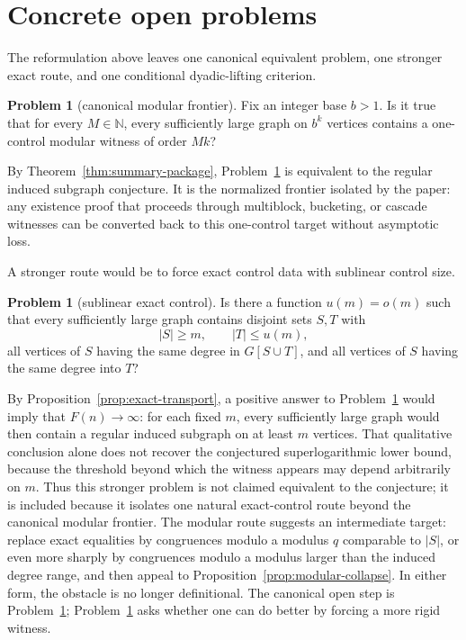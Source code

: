 \documentclass[11pt]{amsart}
\theoremstyle{definition}
\newtheorem{problem}[theorem]{Problem}
\newcommand{\N}{\mathbb{N}}
\begin{document}
\section{Concrete open problems}

The reformulation above leaves one canonical equivalent problem, one stronger exact route, and one
conditional dyadic-lifting criterion.

\begin{problem}[canonical modular frontier]\label{prob:canonical-frontier}
Fix an integer base $b>1$. Is it true that for every $M \in \N$, every sufficiently large graph on
$b^k$ vertices contains a one-control modular witness of order $Mk$?
\end{problem}

By Theorem~\ref{thm:summary-package}, Problem~\ref{prob:canonical-frontier} is equivalent to the
regular induced subgraph conjecture. It is the normalized frontier isolated by the paper: any
existence proof that proceeds through multiblock, bucketing, or cascade witnesses can be converted
back to this one-control target without asymptotic loss.

A stronger route would be to force exact control data with sublinear control size.

\begin{problem}[sublinear exact control]\label{prob:small-control}
Is there a function $u(m)=o(m)$ such that every sufficiently large graph contains disjoint sets
$S,T$ with
\[
  |S| \ge m, \qquad |T| \le u(m),
\]
all vertices of $S$ having the same degree in $G[S \cup T]$, and all vertices of $S$ having the
same degree into $T$?
\end{problem}

By Proposition~\ref{prop:exact-transport}, a positive answer to
Problem~\ref{prob:small-control} would imply that $F(n)\to\infty$: for each fixed $m$, every
sufficiently large graph would then contain a regular induced subgraph on at least $m$ vertices.
That qualitative conclusion alone does not recover the conjectured superlogarithmic lower bound,
because the threshold beyond which the witness appears may depend arbitrarily on $m$. Thus this
stronger problem is not claimed equivalent to the conjecture; it is included because it isolates one
natural exact-control route beyond the canonical modular frontier. The modular route suggests an
intermediate target: replace exact equalities by congruences modulo a modulus $q$ comparable to
$|S|$, or even more sharply by congruences modulo a modulus larger than the induced degree range,
and then appeal to Proposition~\ref{prop:modular-collapse}. In either form, the obstacle is no
longer definitional. The canonical open step is Problem~\ref{prob:canonical-frontier};
Problem~\ref{prob:small-control} asks whether one can do better by forcing a more rigid witness.
\end{document}
